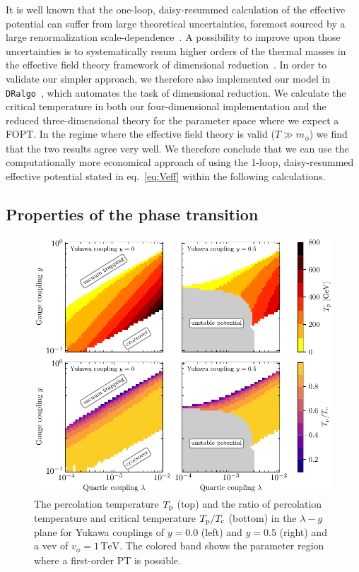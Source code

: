 It is well known that the one-loop, daisy-resummed calculation of the effective potential can suffer from large theoretical uncertainties, foremost sourced by a large renormalization scale-dependence~\cite{Croon:2020cgk}. A possibility to improve upon those uncertainties is to systematically resum higher orders of the thermal masses in the effective field theory framework of dimensional reduction~\cite{Ginsparg:1980ef}. In order to validate our simpler approach, we therefore also implemented our model in \texttt{DRalgo}~\cite{Ekstedt:2022bff}, which automates the task of  dimensional reduction. We calculate the critical temperature in both our four-dimensional implementation and the reduced three-dimensional theory for the parameter space where we expect a \ac{FOPT}. In the regime where the effective field theory is valid ($T \gg m_{\phi}$) we find that the two results agree very well. We therefore conclude that we can use the computationally more economical approach of using the 1-loop, daisy-resummed effective potential stated in eq.~\eqref{eq:Veff} within the following calculations.

\subsection{Properties of the phase transition}
\label{sec:PT}



\begin{figure}[t]
	\centering
	\includegraphics[width=\textwidth]{thesisplots/lisa/thesis_LISA_2}
	\caption{The percolation temperature $T_{\text{p}}$ (top) and the ratio of percolation temperature and critical temperature $T_{\text{p}}/T_{\text{c}}$ (bottom) in the $\lambda-g$ plane for Yukawa couplings of $y=0.0$ (left) and $y=0.5$ (right) and a vev of $v_\phi = 1\, \text{TeV}$. The colored band shows the parameter region where a first-order PT is possible.}
	\label{fig:GWparams-T}
\end{figure}

